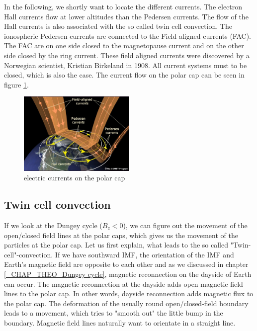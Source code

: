 \documentclass[10pt,a4paper]{article}
\begin{document}
In the following, we shortly want to locate the different currents. 
The electron Hall currents flow at lower altitudes than the Pedersen currents. The flow of the Hall currents is also associated with the so called twin cell convection.
The ionospheric Pedersen currents are connected to the Field aligned currents (FAC). The FAC are on one side closed to the magnetopause current and on the other side closed by the ring current. These field aligned currents were discovered by a Norwegian scientist, Kristian Birkeland in 1908. All current systems must to be closed, which is also the case. The current flow on the polar cap can be seen in figure \ref{electric currents on the polar cap}.

\begin{figure}[h]
\centering
\includegraphics[width=0.5\textwidth]{polar_electric_currents.jpg}
\caption{electric currents on the polar cap\cite{Link1}}
\label{electric currents on the polar cap}
\end{figure}

\subsection{Twin cell convection \label{_CHAP_THEO_twin cell convection}}
If we look at the Dungey cycle ($B_z<0$), we can figure out the movement of the open/closed field lines at the polar caps, which gives us the movement of the particles at the polar cap. Let us first explain, what leads to the so called "Twin-cell"-convection. If we have southward IMF, the orientation of the IMF and Earth's magnetic field are opposite to each other and as we discussed in chapter \ref{_CHAP_THEO_Dungey cycle}, magnetic reconnection on the dayside of Earth can occur. 
The magnetic reconnection at the dayside adds open magnetic field lines to the polar cap. In other words, dayside reconnection adds magnetic flux to the polar cap. The deformation of the usually round open/closed-field boundary leads to a movement, which tries to "smooth out" the little bump in the boundary. 
Magnetic field lines naturally want to orientate in a straight line. 
\end{document}
